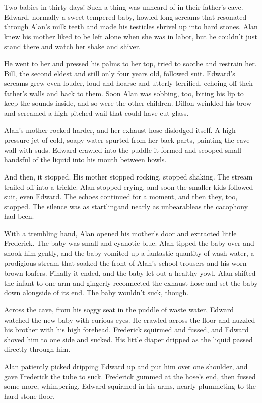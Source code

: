 Two babies in thirty days!  Such a thing was unheard of in their
father's cave.  Edward, normally a sweet-tempered baby, howled long
screams that resonated through Alan's milk teeth and made his
testicles shrivel up into hard stones.  Alan knew his mother liked to
be left alone when she was in labor, but he couldn't just stand there
and watch her shake and shiver.

He went to her and pressed his palms to her top, tried to soothe and
restrain her.  Bill, the second eldest and still only four years old,
followed suit.  Edward's screams grew even louder, loud and hoarse and
utterly terrified, echoing off their father's walls and back to them. 
Soon Alan was sobbing, too, biting his lip to keep the sounds inside,
and so were the other children.  Dillon wrinkled his brow and screamed
a high-pitched wail that could have cut glass.

Alan's mother rocked harder, and her exhaust hose dislodged itself.  A
high-pressure jet of cold, soapy water spurted from her back parts,
painting the cave wall with suds.  Edward crawled into the puddle it
formed and scooped small handsful of the liquid into his mouth between
howls.

And then, it stopped.  His mother stopped rocking, stopped shaking. 
The stream trailed off into a trickle.  Alan stopped crying, and soon
the smaller kids followed suit, even Edward.  The echoes continued for
a moment, and then they, too, stopped.  The silence was as
startling\dash{}and nearly as unbearable\dash{}as the cacophony had been.

With a trembling hand, Alan opened his mother's door and extracted
little Frederick.  The baby was small and cyanotic blue.  Alan tipped
the baby over and shook him gently, and the baby vomited up a
fantastic quantity of wash water, a prodigious stream that soaked the
front of Alan's school trousers and his worn brown loafers.  Finally
it ended, and the baby let out a healthy yowl.  Alan shifted the
infant to one arm and gingerly reconnected the exhaust hose and set
the baby down alongside of its end.  The baby wouldn't suck, though.

Across the cave, from his soggy seat in the puddle of waste water,
Edward watched the new baby with curious eyes.  He crawled across the
floor and nuzzled his brother with his high forehead.  Frederick
squirmed and fussed, and Edward shoved him to one side and sucked. 
His little diaper dripped as the liquid passed directly through him.

Alan patiently picked dripping Edward up and put him over one
shoulder, and gave Frederick the tube to suck.  Frederick gummed at
the hose's end, then fussed some more, whimpering.  Edward squirmed in
his arms, nearly plummeting to the hard stone floor.

